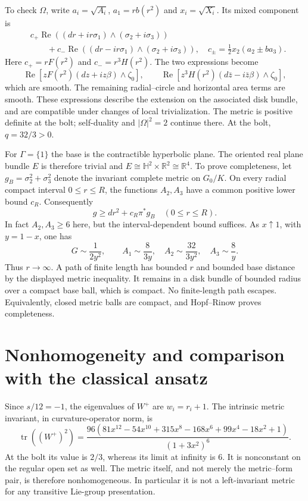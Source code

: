 \documentclass[11pt]{article}
\DeclareMathOperator{\tr}{tr}
\newcommand{\R}{\mathbb R}
\begin{document}
To check $\Omega$, write $a_i=\sqrt{A_i}$, $a_1=rb(r^2)$ and
$x_i=\sqrt{X_i}$. Its mixed component is
\begin{align*}
 &c_+\operatorname{Re}((dr+ir\sigma_1)\wedge(\sigma_2+i\sigma_3))\\
 &\qquad+c_-\operatorname{Re}((dr-ir\sigma_1)\wedge(\sigma_2+i\sigma_3)),
 \quad c_\pm=\tfrac12x_2(a_2\pm ba_3).
\end{align*}
Here $c_+=rF(r^2)$ and $c_-=r^3H(r^2)$. The two expressions become
\[
 \operatorname{Re}[zF(r^2)(dz+iz\beta)\wedge\zeta_0],\qquad
 \operatorname{Re}[z^3H(r^2)(d\bar z-i\bar z\beta)\wedge\zeta_0],
\]
which are smooth. The remaining radial--circle and horizontal area
terms are smooth. These expressions describe the extension on the
associated disk bundle, and are compatible under changes of local
trivialization. The metric is positive definite at the bolt;
self-duality and $|\Omega|^2=2$ continue there. At the bolt,
$q=32/3>0$.

For $\Gamma=\{1\}$ the base is the contractible hyperbolic plane.
The oriented real plane bundle $E$ is therefore trivial and
$E\cong\mathbb H^2\times\R^2\cong\R^4$.
To prove completeness, let $g_B=\sigma_2^2+\sigma_3^2$ denote the
invariant complete metric on $G_0/K$. On every radial compact interval
$0\le r\le R$, the functions $A_2,A_3$ have a common positive lower
bound $c_R$. Consequently
\[
 g\ge dr^2+c_R\pi^*g_B\quad (0\le r\le R).
\]
In fact $A_2,A_3\ge6$ here, but the interval-dependent bound suffices.
As $x\uparrow1$, with $y=1-x$, one has
\[
 G\sim\frac1{2y^2},\qquad
 A_1\sim\frac8{3y},\quad A_2\sim\frac{32}{3y^2},\quad A_3\sim\frac8y.
\]
Thus $r\to\infty$. A path of finite length has bounded $r$ and
bounded base distance by the displayed metric inequality. It remains
in a disk bundle of bounded radius over a compact base ball, which is
compact. No finite-length path escapes. Equivalently, closed metric
balls are compact, and Hopf--Rinow proves completeness.

\section{Nonhomogeneity and comparison with the classical ansatz}

Since $s/12=-1$, the eigenvalues of $W^+$ are $w_i=r_i+1$.
The intrinsic metric invariant, in curvature-operator norm, is
\begin{equation}\label{eq:Wnorm}
 \tr((W^+)^2)=
 \frac{96(81x^{12}-54x^{10}+315x^8-168x^6+99x^4-18x^2+1)}{(1+3x^2)^6}.
\end{equation}
At the bolt its value is $2/3$, whereas its limit at infinity is $6$.
It is nonconstant on the regular open set as well. The metric itself,
and not merely the metric--form pair, is therefore nonhomogeneous.
In particular it is not a left-invariant metric for any transitive
Lie-group presentation.
\end{document}
